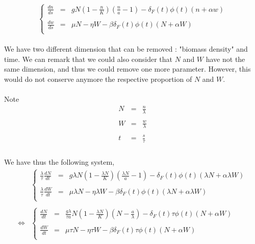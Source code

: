 \documentclass{article}
\begin{document}
\[
\left\lbrace
\begin{array}{rcl}
\frac{dn}{ds} & = & gN(1-\frac{n}{K})(\frac{n}{a}-1) - \delta_F(t)\phi(t)(n+\alpha w) \\
\\
\frac{dw}{ds} & = & \mu N - \eta W - \beta\delta_F(t)\phi(t)(N+\alpha W) \\
\end{array}
\right.
\]

\paragraph{}
We have two different dimension that can be removed : "biomass density" and time. We can remark that we could also consider that $N$ and $W$ have not the same dimension, and thus we could remove one more parameter. However, this would do not conserve anymore the respective proportion of $N$ and $W$.

\paragraph{}
Note
\[
\begin{array}{rcl}
N & = & \frac{n}{\lambda} \\
\\
W & = & \frac{w}{\lambda} \\
\\
t & = & \frac{s}{\tau} \\
\end{array}
\]

\paragraph{}
We have thus the following system,
\[
\begin{array}{rl}
& 

\left\lbrace
\begin{array}{rcl}
\frac{\lambda}{\tau}\frac{dN}{dt} & = & g\lambda N(1-\frac{\lambda N}{K})(\frac{\lambda N}{a}-1) - \delta_F(t)\phi(t)(\lambda N+\alpha \lambda W) \\
\\
\frac{\lambda}{\tau}\frac{dW}{dt} & = & \mu \lambda N -\eta \lambda W - \beta\delta_F(t)\phi(t)(\lambda N+\alpha \lambda W) \\
\end{array}
\right.
\\
\\
\Leftrightarrow & 
\left\lbrace
\begin{array}{rcl}
\frac{dN}{dt} & = & \frac{g \lambda}{\tau a} N(1-\frac{\lambda N}{K})(N-\frac{a}{\lambda}) - \delta_F(t)\tau\phi(t)(N+\alpha W) \\
\\
\frac{dW}{dt} & = & \mu \tau N -\eta \tau W - \beta\delta_F(t)\tau\phi(t)(N+\alpha W) \\
\end{array}
\right.
\end{array}
\]
\end{document}
